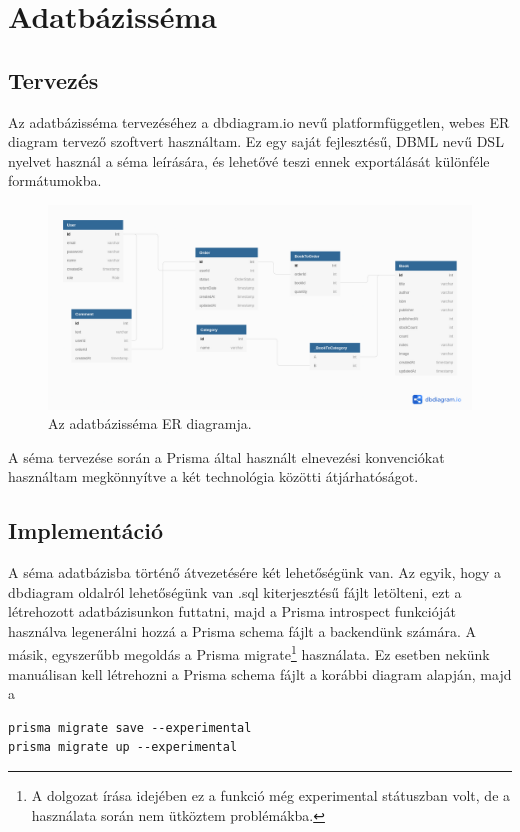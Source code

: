 \section{Adatbázisséma}

\subsection{Tervezés}

Az adatbázisséma tervezéséhez a dbdiagram.io nevű platformfüggetlen, webes ER diagram tervező szoftvert használtam.
Ez egy saját fejlesztésű, DBML nevű DSL nyelvet használ a séma leírására, és lehetővé teszi ennek exportálását különféle formátumokba.

\begin{figure}[!ht]
\centering
\includegraphics[width=150mm, keepaspectratio]{figures/dbschema.png}
\caption{Az adatbázisséma ER diagramja.}
\label{fig:DBSchema}
\end{figure}

A séma tervezése során a Prisma által használt elnevezési konvenciókat használtam megkönnyítve a két technológia közötti átjárhatóságot.

\subsection{Implementáció}

A séma adatbázisba történő átvezetésére két lehetőségünk van. Az egyik, hogy a dbdiagram oldalról lehetőségünk van .sql kiterjesztésű fájlt letölteni,
ezt a létrehozott adatbázisunkon futtatni, majd a Prisma introspect funkcióját használva legenerálni hozzá a Prisma schema fájlt a backendünk számára.
A másik, egyszerűbb megoldás a Prisma migrate\footnote{A dolgozat írása idejében ez a funkció még experimental státuszban volt, de a használata során nem ütköztem problémákba.} használata.
Ez esetben nekünk manuálisan kell létrehozni a Prisma schema fájlt a korábbi diagram alapján, majd a
\begin{lstlisting}
prisma migrate save --experimental
prisma migrate up --experimental
\end{lstlisting}

